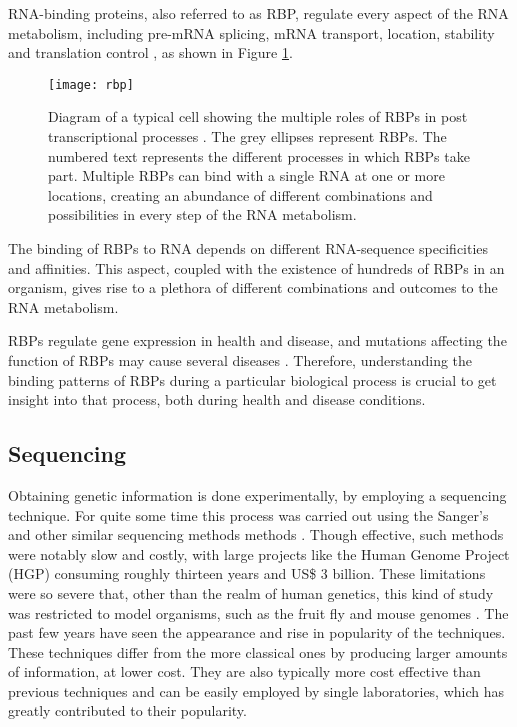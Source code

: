 RNA-binding proteins, also referred to as RBP, regulate every aspect of the RNA
metabolism, including pre-mRNA splicing, mRNA transport, location, stability and
translation control \cite{Cooper2009777, Muller-McNicoll2013, Sonenberg2007721,
Sonenberg2009731}, as shown in Figure \ref{fig:rbp}.

\begin{figure}[!htb]
  \begin{center}
    \leavevmode
    \texttt{[image: rbp]}
    \caption[Role of RBPs in the RNA metabolism process]{
      Diagram of a typical cell showing the multiple roles of RBPs in post
      transcriptional processes \cite{janga2011construction}. The grey ellipses
      represent RBPs. The numbered text represents the different processes in
      which RBPs take part. Multiple RBPs can bind with a single RNA at one or
      more locations, creating an abundance of different combinations and
      possibilities in every step of the RNA metabolism.
    }
    \label{fig:rbp}
  \end{center}
\end{figure}

The binding of RBPs to RNA depends on different RNA-sequence specificities and
affinities. This aspect, coupled with the existence of hundreds of RBPs in an
organism, gives rise to a plethora of different combinations and outcomes to the
RNA metabolism.

RBPs regulate gene expression in health and disease, and mutations affecting the
function of RBPs may cause several diseases \cite{Cooper2009777}. Therefore,
understanding the binding patterns of RBPs during a particular biological
process is crucial to get insight into that process, both during health and
disease conditions.

\subsection{Sequencing}

Obtaining genetic information is done experimentally, by employing a sequencing
technique. For quite some time this process was carried out using the Sanger's
and other similar sequencing methods methods \cite{Reis-Filho2009}. Though
effective, such methods were notably slow and costly, with large projects like
the Human Genome Project (HGP) consuming roughly thirteen years and US\$ 3
billion. These limitations were so severe that, other than the realm of human
genetics, this kind of study was restricted to model organisms, such as the
fruit fly and mouse genomes \cite{Wolf2013}. The past few years have seen the
appearance and rise in popularity of the \ngs{} techniques. These techniques
differ from the more classical ones by producing larger amounts of information,
at lower cost. They are also typically more cost effective than previous
techniques and can be easily employed by single laboratories, which has greatly
contributed to their popularity.


